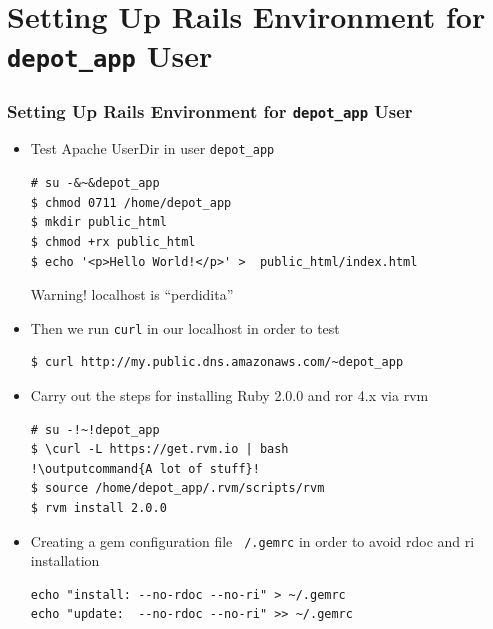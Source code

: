 \documentclass{beamer}
\newcommand{\outputcommand}[1]{\color{darkgreen}{#1}}
\begin{document}
\section{Setting Up Rails Environment for \texttt{depot\_app} User}
\begin{frame}
\frametitle{Setting Up Rails Environment for \texttt{depot\_app} User}
\begin{itemize}

\item Test Apache UserDir in user \texttt{depot\_app}
\lstset{language=shell, escapechar=!}
\begin{lstlisting}[escapechar=&]
# su -&~&depot_app
$ chmod 0711 /home/depot_app
$ mkdir public_html
$ chmod +rx public_html
$ echo '<p>Hello World!</p>' >  public_html/index.html
\end{lstlisting}

\begin{block}{Warning!}
  localhost is ``perdidita''
\end{block}
\item Then we run \texttt{curl} in our \alert{localhost} in order to test 

\begin{lstlisting}[escapechar=&]
$ curl http://my.public.dns.amazonaws.com/~depot_app
\end{lstlisting}

\item Carry out the steps for installing Ruby 2.0.0 and \acrshort{ror} 4.x via \acrshort{rvm}

\lstset{language=shell, escapechar=!}
\begin{lstlisting}[escapechar=!]
# su -!~!depot_app
$ \curl -L https://get.rvm.io | bash
!\outputcommand{A lot of stuff}!
$ source /home/depot_app/.rvm/scripts/rvm
$ rvm install 2.0.0
\end{lstlisting}

\item Creating a gem configuration file \texttt{~/.gemrc} in order to avoid rdoc and ri installation

\lstset{language=shell, escapechar=!}
\begin{lstlisting}[escapechar=!]
echo "install: --no-rdoc --no-ri" > ~/.gemrc
echo "update:  --no-rdoc --no-ri" >> ~/.gemrc
\end{lstlisting}
\end{itemize}
\end{frame}
\end{document}
